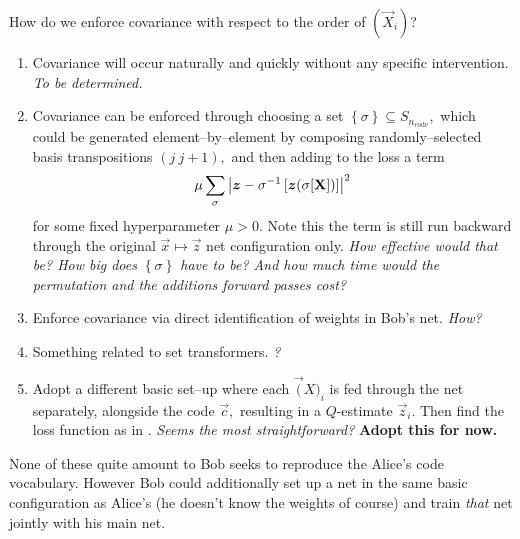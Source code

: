 \documentclass[12pt]{article}
\begin{document}
How do we enforce covariance with respect to the order of $(\vec{X}_{i})$?
\begin{enumerate}
	\item Covariance will occur naturally and quickly without any specific intervention.  {\em To be determined.}
	\item Covariance can be enforced through choosing a set $\left\lbrace \sigma \right\rbrace \subseteq S_{n_\text{code}},$ which could be generated element--by--element by composing randomly--selected basis transpositions $(j\ j+1),$ and then adding to the loss a term
	\begin{equation}
		\mu\sum_\sigma\left\lvert \boldsymbol{z} - \sigma^{-1}\left[\boldsymbol{z}(\sigma[\mathbf{X}])\right] \right\rvert^2
	\end{equation}
	for some fixed hyperparameter $\mu > 0.$  Note this the term is still run backward through the original $\vec{x}\mapsto\vec{z}$ net configuration only.  {\em How effective would that be?  How big does $\left\lbrace \sigma \right\rbrace$ have to be? And how much time would the permutation and the additions forward passes cost?}
	\item Enforce covariance via direct identification of weights in Bob's net.  {\em How?}
	\item Something related to set transformers. {\em ?}
	\item Adopt a different basic set--up where each $\vec(X)_i$ is fed through the net separately, alongside the code $\vec{c},$ resulting in a $Q$-estimate $\vec{z}_i.$  Then find the loss function as in .  {\em Seems the most straightforward?} {\bf Adopt this for now.}
\end{enumerate}
None of these quite amount to Bob seeks to reproduce the Alice's code vocabulary.  However Bob could additionally set up a net in the same basic configuration as Alice's (he doesn't know the weights of course) and train {\em that} net jointly with his main net.



%
\end{document}
